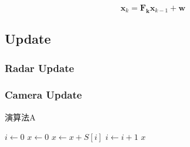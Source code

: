 \begin{equation}\label{equ:predict_eq}
\mathbf{x}_k=\mathbf{F_k}\mathbf{x}_{k-1}+\mathbf{w}
\end{equation}

\subsection{Update}\label{sec:2-update}
\subsubsection{Radar Update}\label{sec:2-radar_update}
\subsubsection{Camera Update}\label{sec:2-camera_update}


\begin{algorithm}[htbp]
    \SetAlgoNoLine

    \caption{演算法A}
    \label{algo:algoexample}



    \AlgoHRule

    $i \gets 0$\;
    $x \gets 0$\;
    \;
    {
        $x \gets x + S[i]$\;
        $i  \gets i + 1$\;
    }
    \BlankLine
    \Return $x$\;
\end{algorithm}